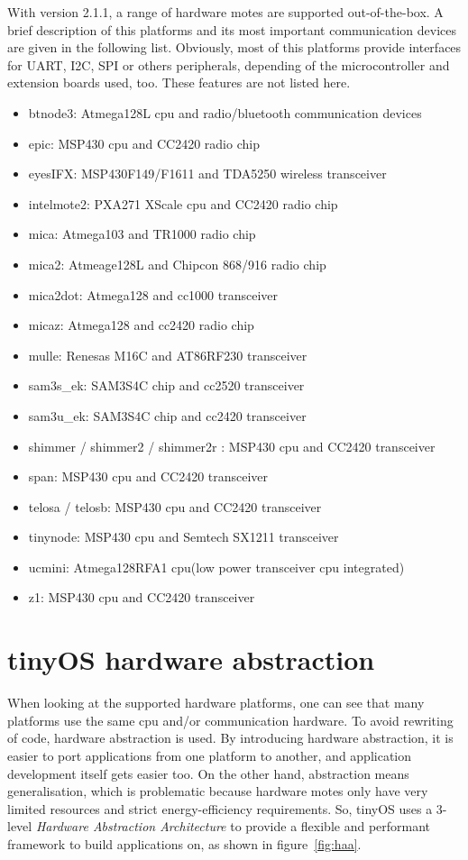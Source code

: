 With version 2.1.1, a range of hardware motes are supported out-of-the-box. A brief description of this platforms and its most important communication devices are given in the following list. Obviously, most of this platforms provide interfaces for UART, I2C, SPI or others peripherals, depending of the microcontroller and extension boards used, too. These features are not listed here.

\begin{itemize}
 \item btnode3: Atmega128L cpu and radio/bluetooth communication devices
 \item epic: MSP430 cpu and CC2420 radio chip
 \item eyesIFX: MSP430F149/F1611 and TDA5250 wireless transceiver
 \item intelmote2: PXA271 XScale cpu and CC2420 radio chip 
 \item mica: Atmega103 and TR1000 radio chip
 \item mica2: Atmeage128L and Chipcon 868/916 radio chip
 \item mica2dot: Atmega128 and cc1000 transceiver
 \item micaz: Atmega128 and cc2420 radio chip
 \item mulle: Renesas M16C and AT86RF230 transceiver
 \item sam3s\_ek: SAM3S4C chip and cc2520 transceiver
 \item sam3u\_ek: SAM3S4C chip and cc2420 transceiver
 \item shimmer / shimmer2 / shimmer2r : MSP430 cpu and CC2420 transceiver
 \item span: MSP430 cpu and CC2420 transceiver
 \item telosa / telosb: MSP430 cpu and CC2420 transceiver
 \item tinynode: MSP430 cpu and Semtech SX1211 transceiver
 \item ucmini: Atmega128RFA1 cpu(low power transceiver cpu integrated)
 \item z1: MSP430 cpu and CC2420 transceiver
\end{itemize}

\section{tinyOS hardware abstraction}

When looking at the supported hardware platforms, one can see that many platforms use the same cpu and/or communication hardware. To avoid rewriting of code, hardware abstraction is used.
By introducing hardware abstraction, it is easier to port applications from one platform to another, and application development itself gets easier too. On the other hand, abstraction means generalisation, which is problematic because hardware motes only have very limited resources and strict energy-efficiency requirements.
So, tinyOS uses a 3-level \textit{Hardware Abstraction Architecture} to provide a flexible and performant framework to build applications on, as shown in figure~\ref{fig:haa}.

